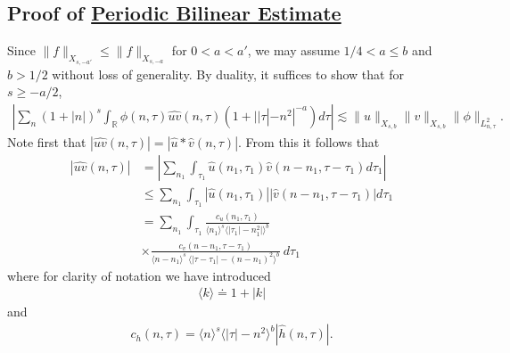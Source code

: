 \documentclass[12pt,reqno]{amsart}
\numberwithin{equation}{section}  %
\newcommand{\rr}{\mathbb{R}}
\newcommand{\wh}{\widehat}
\begin{document}
\subsection{Proof of \hyperref[prop:bilinear-est]{Periodic Bilinear Estimate}} 
\label{sec:proof-bilin-est}
Since $\|f\|_{X_{s,-a'}} \le \|f\|_{X_{s, -a}}$ for $0 < a < a'$, we may assume
$1/4 < a \le b$ and $b > 1/2$ without loss of generality.
By duality, it suffices to show that for $s \ge -a/2$, 
%
\begin{equation}
	\label{duality-est}
	\begin{split}
	|	\sum_{n}  (1 + |n|)^{s}
		\int_{\rr} \phi(n, \tau) \wh{uv}(n, \tau)(1 
    + | |\tau| - n^{2} |^{-a}) d \tau | \lesssim \|u\|_{X_{s,b}}
    \|v\|_{X_{s,b}}
    \|\phi \|_{L^{2}_{n, \tau}}.
	\end{split}
\end{equation}
Note first that $|\wh{uv}(n, \tau) |  = | \wh{u} *  \wh{v} 
(n, \tau)|$. From this it follows that
%
%
\begin{equation}
	\label{non-lin-rep}
	\begin{split}
		| \wh{uv}(n, \tau)|
    & = | \sum_{n_{1}}  \int_{\tau_{1}}
    \wh{u}\left( n_1,  \tau_1 \right) \wh{v}\left( n - n_1 , \tau - \tau_1   
\right) d \tau_1 |
\\
& \le  \sum_{n_{1}}  \int_{\tau_{1}}
    |\wh{u}\left( n_1,  \tau_1 \right)| |\wh{v}\left( n - n_1 , \tau - \tau_1   
\right)| d \tau_1 
\\
& = \sum_{n_{1}} \int_{\tau_{1}} \frac{c_u\left( n_1, \tau_1 
\right)}{\langle n_1 \rangle ^s \langle |\tau_1| - n_1^{2} | \rangle ^{b}}
\\
& \times \frac{c_{v}\left( n - n_1, \tau - \tau_1 \right)}{\langle n -
n_1 \rangle ^s\ \langle |\tau - \tau_1 | -  (n - n_1)^{2} \rangle^{b}}
  \ d \tau_1 
\end{split}
\end{equation}
%
%
where for clarity of notation we have introduced 
%
%
%
\begin{equation*}
\begin{split}
\langle k \rangle \doteq 1 + |k|
\end{split}
\end{equation*}
%
%
and
%
\begin{equation*}
	\begin{split}
		c_h(n, \tau) =
			\langle n \rangle ^s \langle |\tau| - n^{2} \rangle ^{b} | \wh{h}\left( n, \tau \right) |.
	\end{split}
\end{equation*}
\end{document}
